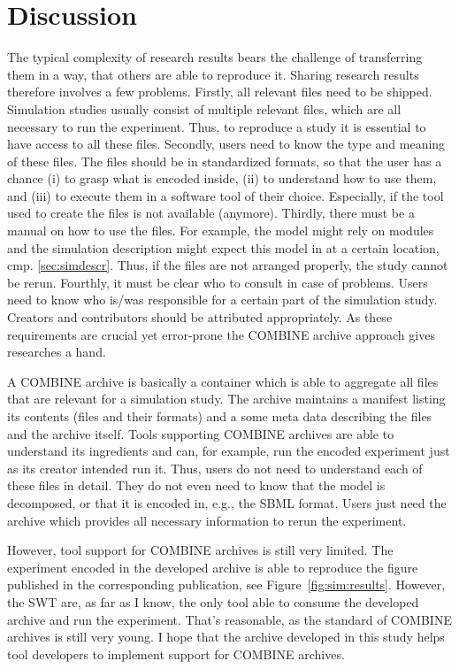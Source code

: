 

\section{Discussion}
The typical complexity of research results bears the challenge of transferring them in a way, that others are able to reproduce it.
Sharing research results therefore involves a few problems.
Firstly, all relevant files need to be shipped.
Simulation studies usually consist of multiple relevant files, which are all necessary to run the experiment.
Thus, to reproduce a study it is essential to have access to all these files.
Secondly, users need to know the type and meaning of these files.
The files should be in standardized formats, so that the user has a chance (i) to grasp what is encoded inside, (ii) to understand how to use them, and (iii) to execute them in a software tool of their choice.
Especially, if the tool used to create the files is not available (anymore).
Thirdly, there must be a manual on how to use the files.
For example, the model might rely on modules and the simulation description might expect this model in at a certain location, cmp. \ref{sec:simdescr}.
Thus, if the files are not arranged properly, the study cannot be rerun.
Fourthly, it must be clear who to consult in case of problems.
Users need to know who is/was responsible for a certain part of the simulation study.
Creators and contributors should be attributed appropriately.
As these requirements are crucial yet error-prone the COMBINE archive approach gives researches a hand.

A COMBINE archive is basically a container which is able to aggregate all files that are relevant for a simulation study.
The archive maintains a manifest listing its contents (files and their formats) and a some meta data describing the files and the archive itself.
Tools supporting COMBINE archives are able to understand its ingredients and can, for example, run the encoded experiment just as its creator intended run it.
Thus, users do not need to understand each of these files in detail.
They do not even need to know that the model is decomposed, or that it is encoded in, e.g., the SBML format.
Users just need the archive which provides all necessary information to rerun the experiment.

However, tool support for COMBINE archives is still very limited.
The experiment encoded in the developed archive is able to reproduce the figure published in the corresponding publication, see Figure~\ref{fig:sim:results}.
However, the SWT are, as far as I know, the only tool able to consume the developed archive and run the experiment.
That's reasonable, as the standard of COMBINE archives is still very young.
I hope that the archive developed in this study helps tool developers to implement support for COMBINE archives.

